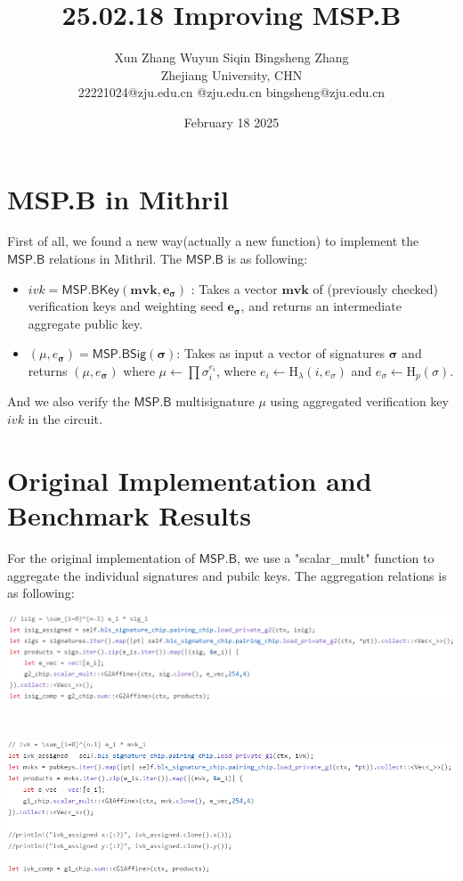 \documentclass{article}
\title{25.02.18 Improving MSP.B}
\author{Xun Zhang \quad \quad Wuyun Siqin \quad \quad Bingsheng Zhang \\ 
Zhejiang University, CHN \\
22221024@zju.edu.cn \quad 3210101763@zju.edu.cn \quad bingsheng@zju.edu.cn}
\date{February 18 2025}
\begin{document}
\maketitle

\section{MSP.B in Mithril}

First of all, we found a new way(actually a new function) to implement the $\mathsf{MSP.B}$ relations in Mithril.
The $\mathsf{MSP.B}$ is as following:

\begin{itemize}
    \item $ivk = \mathsf{MSP.BKey}(\textbf{mvk}, \bm{e_\sigma})$ : Takes a vector $\textbf{mvk}$ of (previously checked) verification keys and weighting seed $\bm{e_\sigma}$, and returns an intermediate aggregate public key.
    \item $(\mu,e_{\bm{\sigma}}) = \mathsf{MSP.BSig}(\bm{\sigma})$: Takes as input a vector of signatures $\bm{\sigma}$ and returns $(\mu,e_{\bm{\sigma}})$ where
$\mu \leftarrow \prod \sigma_i^{e_i}$, where $e_i \leftarrow \textrm{H}_{\lambda}(i,e_\sigma)$ and $e_\sigma \leftarrow \textrm{H}_{p}(\mathbb{\sigma})$.
\end{itemize}

And we also verify the $\mathsf{MSP.B}$ multisignature $\mu$ using aggregated verification key $ivk$ in the circuit.

\section{Original Implementation and Benchmark Results}

For the original implementation of $\mathsf{MSP.B}$, we use a "scalar\_mult" function to aggregate the individual signatures
and pubilc keys. The aggregation relations is as following:

\vspace{0.3cm}


\includegraphics[width=0.9\linewidth]{msp_bkey_isig_code.png}
\\
\\
\\
\includegraphics[width=0.9\linewidth]{msp_bkey_ivk_code.png}
\end{document}
